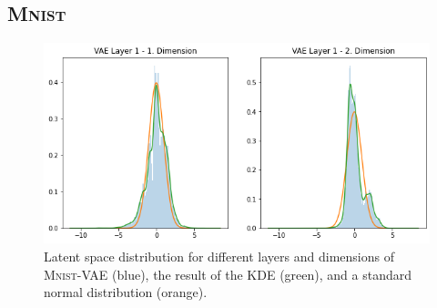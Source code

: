 \subsection{\textsc{Mnist}}\label{subsec:appendix_pixel_wise_statistics_mnist}
\begin{figure}[H]
    \centering
    \includegraphics[width=\textwidth]{images/generated_vs_true/mnist/vae_kde.png}
    \caption[\textsc{Mnist}-VAE - Estimated Latent Space Distribution]{Latent space distribution for different layers and dimensions of \textsc{Mnist}-\ac{VAE} (blue), the result of the \ac{KDE} (green), and a standard normal distribution (orange).}
\end{figure}

